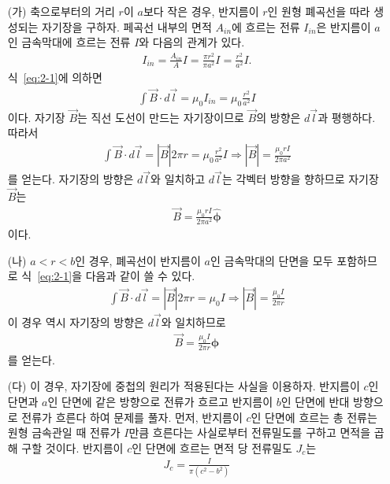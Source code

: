 \documentclass[tightenlines,floatfix,nofootinbib,superscriptaddress,fleqn]{revtex4}
\begin{document}
\begin{itemize}
  \item[(가)]
  축으로부터의 거리 $r$이 $a$보다 작은 경우, 반지름이 $r$인 원형 폐곡선을 따라
  생성되는 자기장을 구하자. 페곡선 내부의 면적 $A_{in}$에 흐르는 전류 $I_{in}$은
  반지름이 $a$인 금속막대에 흐르는 전류 $I$와 다음의 관계가 있다.
  \begin{align}
    I_{in} = \frac{A_{in}}{A}I = \frac{\pi r^2}{\pi a^2}I
    = \frac{r^2}{a^2}I.
  \end{align}
  식~\eqref{eq:2-1}에 의하면
  \begin{align}
    \int \vec{B}\cdot d \vec{l}=\mu_0 I_{in}=\mu_0 \frac{r^2}{a^2}I
  \end{align}
  이다. 자기장 $\vec{B}$는 직선 도선이 만드는 자기장이므로 
  $\vec{B}$의 방향은 $d\vec{l}$과 평행하다. 따라서
  \begin{align}
    \int \vec{B}\cdot d \vec{l} = \left|\vec{B} \right|2\pi r
    =\mu_0\frac{r^2}{a^2}I \Longrightarrow
    \left|\vec{B} \right| = \frac{\mu_0 r I}{2\pi a^2}
  \end{align}
  를 얻는다. 자기장의 방향은 $d\vec{l}$와 일치하고 $d\vec{l}$는 각벡터 방향을
  향하므로 자기장 $\vec{B}$는
  \begin{align}
    \vec{B} = \frac{\mu_0 r I}{2\pi a^2}\hat{\bm \phi}
  \end{align}
  이다.
  \item[(나)]
  $a<r<b$인 경우,  폐곡선이 반지름이 $a$인 금속막대의 단면을 모두 포함하므로
  식~\eqref{eq:2-1}을 다음과 같이 쓸 수 있다.
  \begin{align}
    \int \vec{B}\cdot d \vec{l}=\left|\vec{B} \right|2\pi r=\mu_0 I
    \Longrightarrow 
    \left|\vec{B} \right|=\frac{\mu_0 I}{2\pi r}
  \end{align}
  이 경우 역시 자기장의 방향은 $d\vec{l}$와 일치하므로
  \begin{align}\label{eq:2-2}
    \vec{B} = \frac{\mu_0 I}{2\pi r}\hat{\bm \phi}
  \end{align}
  를 얻는다.
  \item[(다)]
  이 경우, 자기장에 중첩의 원리가 적용된다는 사실을 이용하자.
  반지름이 $c$인 단면과 $a$인 단면에 같은 방향으로 전류가 흐르고
  반지름이 $b$인 단면에 반대 방향으로 전류가 흐른다 하여 문제를 풀자.
  먼저, 반지름이 $c$인 단면에 흐르는 총 전류는 원형 금속관일 때 전류가 $I$만큼 
  흐른다는 사실로부터 전류밀도를 구하고 면적을 곱해 구할 것이다.
  반지름이 $c$인 단면에 흐르는 면적 당 전류밀도 $J_c$는
  \begin{align}
    J_c = \frac{I}{\pi(c^2-b^2)}

\end{align}
\end{itemize}
\end{document}
